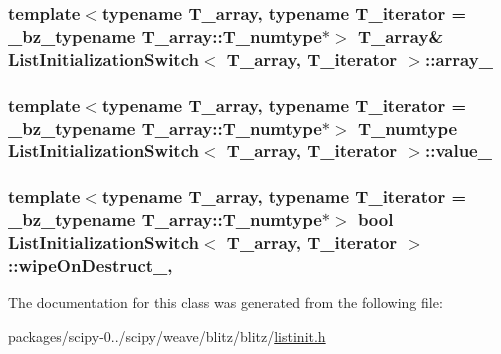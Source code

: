 \subsubsection[{array\+\_\+}]{\setlength{\rightskip}{0pt plus 5cm}template$<$typename T\+\_\+array, typename T\+\_\+iterator  = \+\_\+bz\+\_\+typename T\+\_\+array\+::\+T\+\_\+numtype$\ast$$>$ T\+\_\+array\& {\bf List\+Initialization\+Switch}$<$ T\+\_\+array, T\+\_\+iterator $>$\+::array\+\_\+\hspace{0.3cm}{\ttfamily [protected]}}\label{classListInitializationSwitch_a376d96d286a26585bf025c3fd9a8cad4}
\hypertarget{classListInitializationSwitch_a89b33e2549664fee19e796c8cee8a06f}{}
\subsubsection[{value\+\_\+}]{\setlength{\rightskip}{0pt plus 5cm}template$<$typename T\+\_\+array, typename T\+\_\+iterator  = \+\_\+bz\+\_\+typename T\+\_\+array\+::\+T\+\_\+numtype$\ast$$>$ {\bf T\+\_\+numtype} {\bf List\+Initialization\+Switch}$<$ T\+\_\+array, T\+\_\+iterator $>$\+::value\+\_\+\hspace{0.3cm}{\ttfamily [protected]}}\label{classListInitializationSwitch_a89b33e2549664fee19e796c8cee8a06f}
\hypertarget{classListInitializationSwitch_a7f44ada4e2b0abd813eb2acfc72c69cc}{}
\subsubsection[{wipe\+On\+Destruct\+\_\+}]{\setlength{\rightskip}{0pt plus 5cm}template$<$typename T\+\_\+array, typename T\+\_\+iterator  = \+\_\+bz\+\_\+typename T\+\_\+array\+::\+T\+\_\+numtype$\ast$$>$ {\bf bool} {\bf List\+Initialization\+Switch}$<$ T\+\_\+array, T\+\_\+iterator $>$\+::wipe\+On\+Destruct\+\_\+\hspace{0.3cm}{\ttfamily [mutable]}, {\ttfamily [protected]}}\label{classListInitializationSwitch_a7f44ada4e2b0abd813eb2acfc72c69cc}


The documentation for this class was generated from the following file\+:\begin{DoxyCompactItemize}
\item 
packages/scipy-\/0../scipy/weave/blitz/blitz/\hyperlink{listinit_8h}{listinit.\+h}\end{DoxyCompactItemize}
